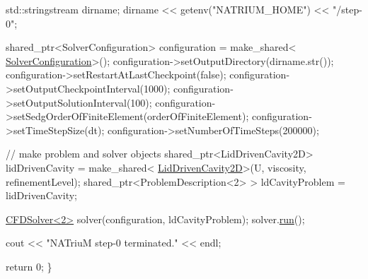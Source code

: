\begin{DoxyCodeInclude}
        std::stringstream dirname;
        dirname << getenv(\textcolor{stringliteral}{"NATRIUM\_HOME"}) << \textcolor{stringliteral}{"/step-0"};

        shared\_ptr<SolverConfiguration> configuration = make\_shared<
                        \hyperlink{classnatrium_1_1SolverConfiguration}{SolverConfiguration}>();
        configuration->setOutputDirectory(dirname.str());
        configuration->setRestartAtLastCheckpoint(\textcolor{keyword}{false});
        configuration->setOutputCheckpointInterval(1000);
        configuration->setOutputSolutionInterval(100);
        configuration->setSedgOrderOfFiniteElement(orderOfFiniteElement);
        configuration->setTimeStepSize(dt);
        configuration->setNumberOfTimeSteps(200000);

        \textcolor{comment}{// make problem and solver objects}
        shared\_ptr<LidDrivenCavity2D> lidDrivenCavity = make\_shared<
                        \hyperlink{classnatrium_1_1LidDrivenCavity2D}{LidDrivenCavity2D}>(U, viscosity, refinementLevel);
        shared\_ptr<ProblemDescription<2> > ldCavityProblem = lidDrivenCavity;

        \hyperlink{classnatrium_1_1CFDSolver}{CFDSolver<2>} solver(configuration, ldCavityProblem);
        solver.\hyperlink{classnatrium_1_1CFDSolver_a11f503bc3f3c306b240874c74a38025b}{run}();

        cout << \textcolor{stringliteral}{"NATriuM step-0 terminated."} << endl;

        \textcolor{keywordflow}{return} 0;
\}

\end{DoxyCodeInclude}
 